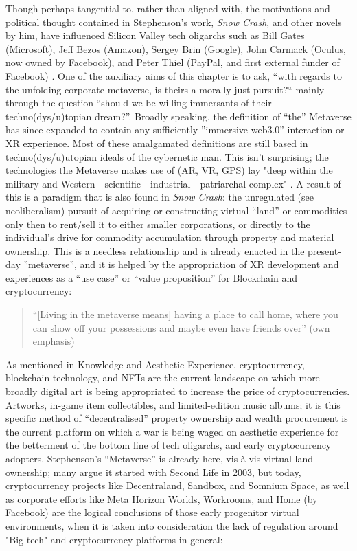 Though perhaps tangential to, rather than aligned with, the motivations and political thought contained in Stephenson’s work, \textit{Snow Crash}, and other novels by him, have influenced Silicon Valley tech oligarchs such as Bill Gates (Microsoft), Jeff Bezos (Amazon), Sergey Brin (Google), John Carmack (Oculus, now owned by Facebook), and Peter Thiel (PayPal, and first external funder of Facebook) \citep[]{rogers2021}. One of the auxiliary aims of this chapter is to ask, “with regards to the unfolding corporate metaverse, is theirs a morally just pursuit?“ mainly through the question “should we be willing immersants of their techno(dys/u)topian dream?”. Broadly speaking, the definition of “the” Metaverse has since expanded to contain any sufficiently ”immersive web3.0” interaction or XR experience. Most of these amalgamated definitions are still based in techno(dys/u)utopian ideals of the cybernetic man. This isn't surprising; the technologies the Metaverse makes use of (AR, VR, GPS) lay "deep within the military and Western - scientific - industrial - patriarchal complex" \cite{davies2004}. A result of this is a paradigm that is also found in \textit{Snow Crash}: the unregulated (see neoliberalism) pursuit of acquiring or constructing virtual “land” or commodities only then to rent/sell it to either smaller corporations, or directly to the individual's drive for commodity accumulation through property and material ownership. This is a needless relationship and is already enacted in the present-day ”metaverse”, and it is helped by the appropriation of XR development and experiences as a “use case” or “value proposition” for Blockchain and cryptocurrency:
\begin{quote}
    “[Living in the metaverse means] having a place to call home, where you can show off your possessions and maybe even have friends over” (own emphasis) \citep[]{marr2022}
\end{quote}
As mentioned in Knowledge and Aesthetic Experience, cryptocurrency, blockchain technology, and NFTs are the current landscape on which more broadly digital art is being appropriated to increase the price of cryptocurrencies. Artworks, in-game item collectibles, and limited-edition music albums; it is this specific method of “decentralised” property ownership and wealth procurement is the current platform on which a war is being waged on aesthetic experience for the betterment of the bottom line of tech oligarchs, and early cryptocurrency adopters. Stephenson’s “Metaverse” is already here, vis-à-vis virtual land ownership; many argue it started with Second Life in 2003, but today, cryptocurrency projects like Decentraland, Sandbox, and Somnium Space, as well as corporate efforts like Meta Horizon Worlds, Workrooms, and Home (by Facebook) are the logical conclusions of those early progenitor virtual environments, when it is taken into consideration the lack of regulation around "Big-tech" and cryptocurrency platforms in general:
